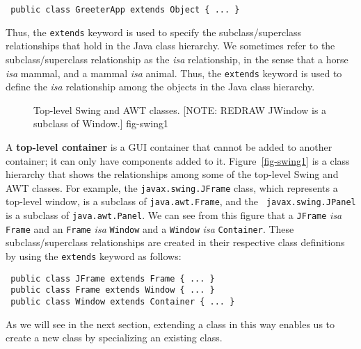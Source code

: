 \begin{jjjlisting}
\begin{lstlisting}
 public class GreeterApp extends Object { ... }
\end{lstlisting}
\end{jjjlisting}

\noindent Thus, the {\tt extends} keyword is used to specify the
subclass/superclass relationships that hold in the Java class
hierarchy.  We sometimes refer to the subclass/superclass relationship
as the {\em isa} relationship, in the sense that a horse {\em isa}
mammal, and a mammal {\em isa} animal. Thus, the {\tt extends} keyword
is used to define the {\em isa} relationship among the objects in the
Java class hierarchy.

\begin{figure}[tb]
{Top-level Swing and AWT classes. [NOTE: REDRAW JWindow
is a subclass of Window.]
} {fig-swing1}

\end{figure}

A {\bf top-level container} is a GUI container that cannot be added to
another container; it can only have components added to it.
Figure~\ref{fig-swing1} is a class hierarchy that shows the
relationships among some of the top-level Swing and AWT classes.  For
example, the {\tt javax.swing.JFrame} class, which represents a
top-level window, is a subclass of {\tt java.awt.Frame}, and the {\tt
javax.swing.JPanel} is a subclass of {\tt java.awt.Panel}.  We
can see from this figure that a {\tt JFrame} {\it isa} {\tt Frame}
and an {\tt Frame} {\it isa} {\tt Window} and a {\tt Window} {\it isa}
{\tt Container}.  These subclass/superclass relationships are created
in their respective class definitions by using the {\tt extends}
keyword as follows:

\begin{jjjlisting}
\begin{lstlisting}
 public class JFrame extends Frame { ... }
 public class Frame extends Window { ... }
 public class Window extends Container { ... }
\end{lstlisting}
\end{jjjlisting}

\noindent As we will see in the next section, extending a class in this way
enables us to create a new class by specializing an existing class.

